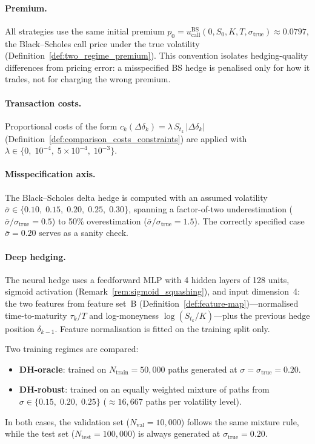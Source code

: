 \documentclass[12pt,a4paper]{article}
\theoremstyle{definition}
\theoremstyle{plain}
\theoremstyle{remark}
\theoremstyle{plain}
\begin{document}
\paragraph{Premium.}
All strategies use the same initial premium
$p_0 = u^{\mathrm{BS}}_{\mathrm{call}}(0, S_0, K, T, \sigma_{\mathrm{true}})
\approx 0.0797$,
the Black--Scholes call price under the true volatility
(Definition~\ref{def:two_regime_premium}).
This convention isolates hedging-quality differences from pricing error:
a misspecified BS hedge is penalised only for how it trades, not for
charging the wrong premium.
 
\paragraph{Transaction costs.}
Proportional costs of the form
$c_k(\Delta\delta_k) = \lambda\,S_{t_k}\,|\Delta\delta_k|$
(Definition~\ref{def:comparison_costs_constraints})
are applied with $\lambda \in \{0,\; 10^{-4},\; 5 \times 10^{-4},\; 10^{-3}\}$.
 
\paragraph{Misspecification axis.}
The Black--Scholes delta hedge is computed with an assumed volatility
$\bar\sigma \in \{0.10,\; 0.15,\; 0.20,\; 0.25,\; 0.30\}$,
spanning a factor-of-two underestimation ($\bar\sigma / \sigma_{\mathrm{true}} = 0.5$)
to 50\% overestimation ($\bar\sigma / \sigma_{\mathrm{true}} = 1.5$).
The correctly specified case $\bar\sigma = 0.20$ serves as a sanity check.
 
\paragraph{Deep hedging.}
The neural hedge uses a feedforward MLP with 4 hidden layers of 128 units,
sigmoid activation (Remark~\ref{rem:sigmoid_squashing}), and input dimension~4:
the two features from feature set~B
(Definition~\ref{def:feature-map})---normalised time-to-maturity $\tau_k/T$
and log-moneyness $\log(S_{t_k}/K)$---plus the previous hedge
position $\delta_{k-1}$.
Feature normalisation is fitted on the training split only.
 
Two training regimes are compared:
\begin{itemize}
  \item \textbf{DH-oracle}: trained on $N_{\mathrm{train}} = 50{,}000$ paths
        generated at $\sigma = \sigma_{\mathrm{true}} = 0.20$.
  \item \textbf{DH-robust}: trained on an equally weighted mixture of paths
        from $\sigma \in \{0.15,\; 0.20,\; 0.25\}$
        ($\approx 16{,}667$ paths per volatility level).
\end{itemize}
In both cases, the validation set ($N_{\mathrm{val}} = 10{,}000$) follows
the same mixture rule, while the test set
($N_{\mathrm{test}} = 100{,}000$) is always generated at
$\sigma_{\mathrm{true}} = 0.20$.
 
\end{document}
